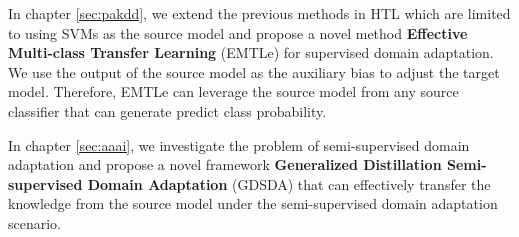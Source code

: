 In chapter \ref{sec:pakdd}, we extend the previous methods in HTL which are limited to using SVMs as the source model and propose a novel method \textbf{Effective Multi-class Transfer Learning} (EMTLe) for supervised domain adaptation. We use the output of the source model as the auxiliary bias to adjust the target model. Therefore, EMTLe can leverage the source model from any source classifier that can generate predict class probability.

In chapter \ref{sec:aaai}, we investigate the problem of semi-supervised domain adaptation and propose a novel framework \textbf{Generalized Distillation Semi-supervised Domain Adaptation} (GDSDA) that can effectively transfer the knowledge from the source model under the semi-supervised domain adaptation scenario. 